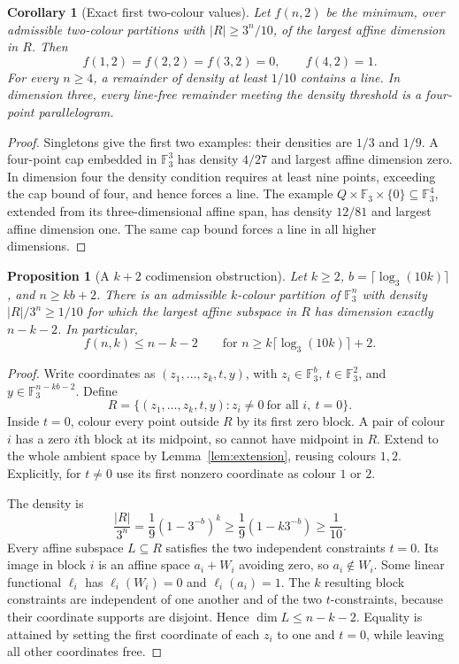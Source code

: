 \documentclass[11pt]{article}
\newtheorem{proposition}[theorem]{Proposition}
\newtheorem{corollary}[theorem]{Corollary}
\theoremstyle{remark}
\newcommand{\F}{\mathbb F_3}
\begin{document}
\begin{corollary}[Exact first two-colour values]\label{cor:small}
Let $f(n,2)$ be the minimum, over admissible two-colour partitions with
$|R|\geq3^n/10$, of the largest affine dimension in $R$. Then
\[
 f(1,2)=f(2,2)=f(3,2)=0,\qquad f(4,2)=1.
\]
For every $n\geq4$, a remainder of density at least $1/10$ contains a line.
In dimension three, every line-free remainder meeting the density threshold
is a four-point parallelogram.
\end{corollary}
\begin{proof}
Singletons give the first two examples: their densities are $1/3$ and $1/9$.
A four-point cap embedded in $\F^3$ has density $4/27$ and largest affine
dimension zero. In dimension four the density condition requires at least
nine points, exceeding the cap bound of four, and hence forces a line.
The example $Q\times\F\times\{0\}\subseteq\F^4$, extended from its
three-dimensional affine span, has density $12/81$ and largest affine
dimension one. The same cap bound forces a line in all higher dimensions.
\end{proof}

\begin{proposition}[A $k+2$ codimension obstruction]\label{prop:block}
Let $k\geq2$, $b=\lceil\log_3(10k)\rceil$, and $n\geq kb+2$.
There is an admissible $k$-colour partition of $\F^n$ with density
$|R|/3^n\geq1/10$ for which the largest affine subspace in $R$ has dimension
exactly $n-k-2$. In particular,
\[
 f(n,k)\leq n-k-2\qquad
 \text{for }n\geq k\lceil\log_3(10k)\rceil+2.
\]
\end{proposition}
\begin{proof}
Write coordinates as $(z_1,\ldots,z_k,t,y)$, with
$z_i\in\F^b$, $t\in\F^2$, and $y\in\F^{n-kb-2}$. Define
\[
 R=\{(z_1,\ldots,z_k,t,y):z_i\neq0\ \text{for all }i,\ t=0\}.
\]
Inside $t=0$, colour every point outside $R$ by its first zero block.
A pair of colour $i$ has a zero $i$th block at its midpoint, so cannot have
midpoint in $R$. Extend to the whole ambient space by
Lemma~\ref{lem:extension}, reusing colours $1,2$. Explicitly, for $t\neq0$
use its first nonzero coordinate as colour $1$ or $2$.

The density is
\[
 \frac{|R|}{3^n}=\frac19(1-3^{-b})^k
 \geq\frac19(1-k3^{-b})\geq\frac1{10}.
\]
Every affine subspace $L\subseteq R$ satisfies the two independent
constraints $t=0$. Its image in block $i$ is an affine space $a_i+W_i$
avoiding zero, so $a_i\notin W_i$. Some linear functional $\ell_i$ has
$\ell_i(W_i)=0$ and $\ell_i(a_i)=1$. The $k$ resulting block constraints
are independent of one another and of the two $t$-constraints, because
their coordinate supports are disjoint. Hence $\dim L\leq n-k-2$.
Equality is attained by setting the first coordinate of each $z_i$ to one
and $t=0$, while leaving all other coordinates free.
\end{proof}
\end{document}
